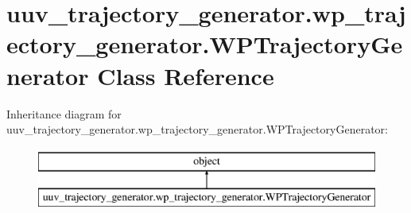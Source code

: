 \hypertarget{classuuv__trajectory__generator_1_1wp__trajectory__generator_1_1WPTrajectoryGenerator}{}\section{uuv\+\_\+trajectory\+\_\+generator.\+wp\+\_\+trajectory\+\_\+generator.\+W\+P\+Trajectory\+Generator Class Reference}
\label{classuuv__trajectory__generator_1_1wp__trajectory__generator_1_1WPTrajectoryGenerator}
Inheritance diagram for uuv\+\_\+trajectory\+\_\+generator.\+wp\+\_\+trajectory\+\_\+generator.\+W\+P\+Trajectory\+Generator\+:\begin{figure}[H]
\begin{center}
\leavevmode
\includegraphics[height=2.000000cm]{classuuv__trajectory__generator_1_1wp__trajectory__generator_1_1WPTrajectoryGenerator}
\end{center}
\end{figure}

